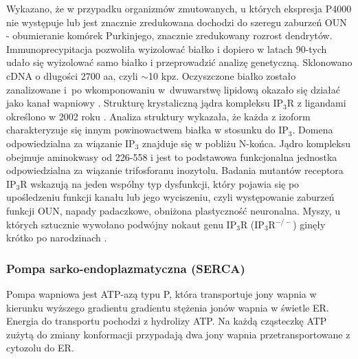 Wykazano, że w przypadku organizmów zmutowanych, u których ekspresja P4000 nie występuje lub jest znacznie zredukowana dochodzi do szeregu zaburzeń OUN - obumieranie komórek Purkinjego, znacznie zredukowany rozrost dendrytów. Immunoprecypitacja pozwoliła wyizolować białko i dopiero w latach 90-tych udało się wyizolować samo białko i przeprowadzić analizę genetyczną. Sklonowano cDNA o długości 2700 aa, czyli $\sim$10 kpz. Oczyszczone białko zostało zanalizowane i~po wkomponowaniu w~dwuwarstwę lipidową okazało się działać jako kanał wapniowy \cite{Mikoshiba2012}. Strukturę krystaliczną jądra kompleksu IP$_3$R z ligandami określono w 2002 roku \cite{Bosanac2002}. Analiza struktury wykazała, że każda z izoform charakteryzuje się innym powinowactwem białka w stosunku do IP$_3$. Domena odpowiedzialna za wiązanie IP$_3$ znajduje się w pobliżu N-końca. Jądro kompleksu obejmuje aminokwasy od 226-558 i jest to podstawowa funkcjonalna jednostka odpowiedzialna za wiązanie trifosforanu inozytolu. 
Badania mutantów receptora IP$_3$R wskazują na jeden wspólny typ dysfunkcji, który pojawia się po upośledzeniu funkcji kanału lub jego wyciszeniu, czyli występowanie zaburzeń funkcji OUN, napady padaczkowe, obniżona plastyczność neuronalna. Myszy, u których sztucznie wywołano podwójny nokaut genu IP$_3$R (IP$_3$R$^{-/-}$) ginęły krótko po narodzinach \cite{Katsuhiko2007}.

\FloatBarrier
\subsubsection{Pompa sarko-endoplazmatyczna (SERCA)}

Pompa wapniowa jest ATP-azą typu P, która transportuje jony wapnia w kierunku wyższego gradientu gradientu stężenia jonów wapnia w świetle ER. Energia do transportu pochodzi z hydrolizy ATP. Na każdą cząsteczkę ATP zużytą do zmiany konformacji przypadają dwa jony wapnia przetransportowane z cytozolu do ER.


%


